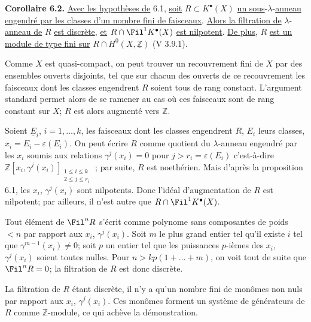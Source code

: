 
\textbf{Corollaire 6.2.} \uline{Avec les hypothèses de} 6.1, \uline{soit} $R\subset K^{\bullet}(X)$ \uline{un sous}-$\lambda$-\uline{anneau engendré par les classes d'un nombre fini de faisceaux}. \uline{Alors la filtration de} $\lambda$-\uline{anneau de} $R$ \uline{est discrète}, \uline{et} $R\cap\Fil^1K^{\bullet}(X)$ \uline{est nilpotent}. \uline{De plus}, $R$ \uline{est un module de type fini sur} $R\cap H^0(X,\underline{\mathbb Z})$ (V 3.9.1).

Comme $X$ est quasi-compact, on peut trouver un recouvrement fini de $X$ par des ensembles ouverts disjoints, tel que sur chacun des ouverts de ce recouvrement les faisceaux dont les classes engendrent $R$ soient tous de rang constant. L'argument standard permet alors de se ramener au cas où ces faisceaux sont de rang constant sur $X$; $R$ est alors augmenté vers $\mathbb Z$.

Soient $\underline{E}_i$, $i=1,\ldots,k$, les faisceaux dont les classes engendrent $R$, $E_i$ leurs classes, $x_i=E_i-\varepsilon(E_i)$. On peut écrire $R$ comme quotient du $\lambda$-anneau engendré par les $x_i$ soumis aux relations $\gamma^j(x_i)=0$ pour $j>r_i=\varepsilon(E_i)$ c'est-à-dire $\mathbb Z[x_i,\gamma^j(x_i)]_{\substack{1\le i\le k\\2\le j\le r_i}}$ ; par suite, $R$ est noethérien. Mais d'après la proposition 6.1, les $x_i$, $\gamma^j(x_i)$ sont nilpotents. Donc l'idéal d'augmentation de $R$ est nilpotent; par ailleurs, il n'est autre que $R\cap\Fil^1K^{\bullet}(X)$.

Tout élément de $\Fil^n R$ s'écrit comme polynome sans composantes de poids $<n$ par rapport aux $x_i$, $\gamma^j(x_i)$. Soit $m$ le plus grand entier tel qu'il existe $i$ tel que $\gamma^{m-1}(x_i)\ne0$; soit $p$ un entier tel que les puissances $p$-ièmes des $x_i$, $\gamma^j(x_i)$ soient toutes nulles. Pour $n>kp(1+\ldots+m)$, on voit tout de suite que $\Fil^nR=0$; la filtration de $R$ est donc discrète.

La filtration de $R$ étant discrète, il n'y a qu'un nombre fini de monômes non nuls par rapport aux $x_i$, $\gamma^j(x_i)$. Ces monômes forment un système de générateurs de $R$ comme $\mathbb Z$-module, ce qui achève la démonstration.

